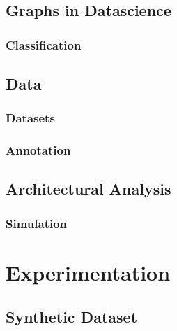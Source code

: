 \documentclass[a4paper,11pt]{report}
\begin{document}
    \lipsum[3-8]

    \section{Graphs in Datascience}

        \lipsum[10-17]
            
        \subsection{Classification}

            \lipsum[8-12]

    \section{Data}

        \lipsum[14-17]

        \subsection{Datasets}

            \lipsum[8-12]
            
        \subsection{Annotation}

            \lipsum[8-12]
            
    \section{Architectural Analysis}

        \lipsum[14-17]

        \subsection{Simulation}

            \lipsum[11-17]

\chapter{Experimentation}

    \lipsum[2-10]

    \section{Synthetic Dataset}
\end{document}
